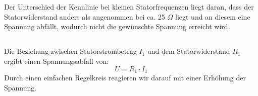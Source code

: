 \chapter{}\label{ex:aufg7}
%
\section{}\label{sec:aufg7a}

\section{}\label{sec:aufg7b}
Der Unterschied der Kennlinie bei kleinen Statorfrequenzen liegt daran, dass der Statorwiderstand anders als angenommen bei ca. 25 $\Omega$ liegt und an diesem eine Spannung abfällt, wodurch nicht die gewünschte Spannung erreicht wird.
\section{}\label{sec:aufg7c}
Die Beziehung zwischen Statorstrombetrag $I_1$ und dem Statorwiderstand $R_1$ ergibt einen Spannungsabfall von:
\begin{equation}
	U = R_1 \cdot I_1
\end{equation}
Durch einen einfachen Regelkreis reagieren wir darauf mit einer Erhöhung der Spannung. 
